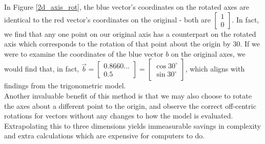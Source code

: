 \documentclass[12pt, a4paper]{article}
\begin{document}
In Figure \ref{2d_axis_rot}, the blue vector's coordinates on the rotated axes
are identical to the red vector's coordinates on the original - both are
$\begin{bmatrix}1 \\ 0\end{bmatrix}$. In fact, we find that any one point on our
original axis has a counterpart on the rotated axis which corresponds to the
rotation of that point about the origin by $30$\textdegree. If we were to
examine the coordinates of the blue vector $b$ on the original axes, we
would find that, in fact, $
    \vec{b}
    =
    \begin{bmatrix}
        0.8660 \hdots \\ 0.5
    \end{bmatrix}
    =
    \begin{bmatrix}
        \cos 30^\circ \\
        \sin 30^\circ
    \end{bmatrix}
$, which aligns with findings from the trigonometric model. \\

Another invaluable benefit of this method is that we may also choose to rotate
the axes about a different point to the origin, and observe the correct
off-centric rotations for vectors without any changes to how the model is
evaluated. Extrapolating this to three dimensions yields immeasurable savings in
complexity and extra calculations which are expensive for computers to do. \\
\end{document}
